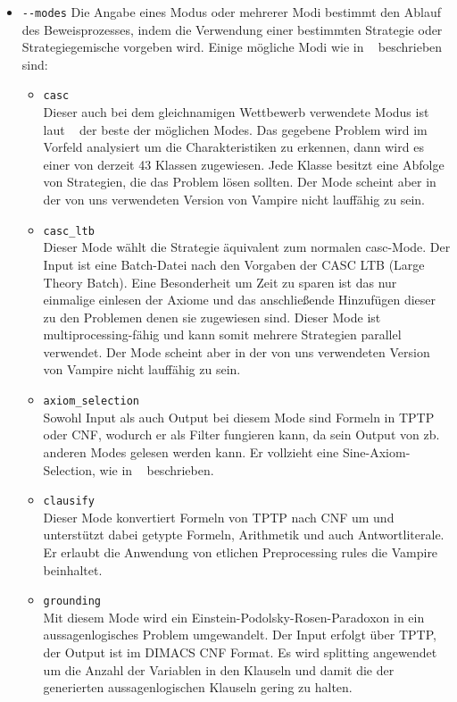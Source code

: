\documentclass{article}
\begin{document}
\begin{itemize}
\item \verb|--modes| \label{arg:modes}
Die Angabe eines Modus oder mehrerer Modi bestimmt den Ablauf des Beweisprozesses, 
indem die Verwendung einer bestimmten Strategie oder Strategiegemische vorgeben wird.
Einige mögliche Modi wie in ~\cite{hoder2011slides} beschrieben sind:
\begin{itemize}
	\item \verb|casc| \\
	Dieser auch bei dem gleichnamigen Wettbewerb verwendete Modus ist laut ~\cite{hoder2011slides} der beste der möglichen Modes.
	Das gegebene Problem wird im Vorfeld analysiert um die Charakteristiken zu erkennen, dann wird es einer von derzeit 43 Klassen zugewiesen. Jede Klasse besitzt eine Abfolge von Strategien, die das Problem lösen sollten.
	Der Mode scheint aber in der von uns verwendeten Version von Vampire nicht lauffähig zu sein.
	\item \verb|casc_ltb| \\
	Dieser Mode wählt die Strategie äquivalent zum normalen casc-Mode. Der Input ist eine Batch-Datei nach den Vorgaben der CASC LTB (Large Theory Batch). Eine Besonderheit um Zeit zu sparen ist das nur einmalige einlesen der Axiome und das anschließende Hinzufügen dieser zu den Problemen denen sie zugewiesen sind. Dieser Mode ist multiprocessing-fähig und kann somit mehrere Strategien parallel verwendet.
	Der Mode scheint aber in der von uns verwendeten Version von Vampire nicht lauffähig zu sein.
	\item \verb|axiom_selection| \\
	Sowohl Input als auch Output bei diesem Mode sind Formeln in TPTP oder CNF, wodurch er als Filter fungieren kann, da sein Output von zb. anderen Modes gelesen werden kann.
	Er vollzieht eine Sine-Axiom-Selection, wie in ~\cite{sinquanon} beschrieben.
	\item \verb|clausify| \\
	Dieser Mode konvertiert Formeln von TPTP nach CNF um und unterstützt dabei getypte Formeln, Arithmetik und auch Antwortliterale. Er erlaubt die Anwendung von etlichen Preprocessing rules die Vampire beinhaltet.
	\item \verb|grounding| \\
	Mit diesem Mode wird ein Einstein-Podolsky-Rosen-Paradoxon in ein aussagenlogisches Problem umgewandelt. Der Input erfolgt über TPTP, der Output ist im DIMACS CNF Format.
	Es wird splitting angewendet um die Anzahl der Variablen in den Klauseln und damit die der generierten aussagenlogischen Klauseln gering zu halten.

\end{itemize}
\end{itemize}
\end{document}
